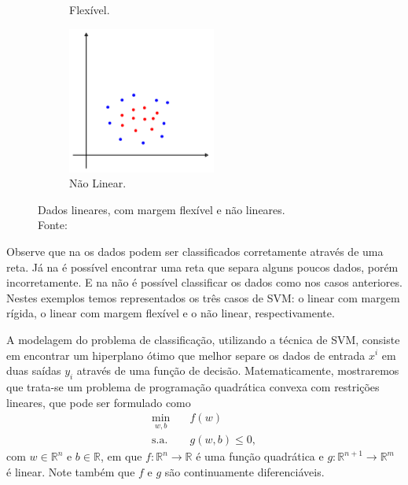\documentclass[12pt,a4paper]{scrartcl}
\def\RR{\mathds{R}}
\theoremstyle{definition}%
\begin{document}
\begin{figure}[!h]
\begin{subfigure}[!h]{0.3\textwidth}
	\caption{Flexível. \label{fig1:b}}
\end{subfigure}
\begin{subfigure}[!h]{0.3\textwidth}
	\centering
	\includegraphics[width=\textwidth]{SVM_naolinear}
	\caption{Não Linear. \label{fig1:c}}
\end{subfigure}
\caption{Dados lineares, com margem flexível e não lineares. \label{fig1}\\ Fonte: \textcite{Evelin2017}}
\end{figure}

Observe que na  os dados podem ser classificados corretamente através de uma reta. Já na  é possível encontrar uma reta que separa alguns poucos dados, porém incorretamente. E na  não é possível classificar os dados como nos casos anteriores. Nestes exemplos temos representados os três casos de SVM: o linear com margem rígida, o linear com margem flexível e o não linear, respectivamente.

A modelagem do problema de classificação, utilizando a técnica de SVM, consiste em encontrar um hiperplano ótimo que melhor separe os dados de entrada $x^i$ em duas saídas $y_i$ através de uma função de decisão. Matematicamente, mostraremos que trata-se um problema de programação quadrática convexa com restrições lineares, que pode ser formulado como
\[
\begin{aligned}
\min_{w,b} & \quad f(w) \\
\text{s.a.} &  \quad g(w,b) \leq 0, \end{aligned}
\]
com $w\in \RR^n$ e $b\in \RR $, em que $f: \RR^n \rightarrow \RR$ é uma função quadrática e $g: \RR^{n+1} \rightarrow \RR^m$ é linear. Note também que $f$ e $g$ são continuamente diferenciáveis.
\end{document}
